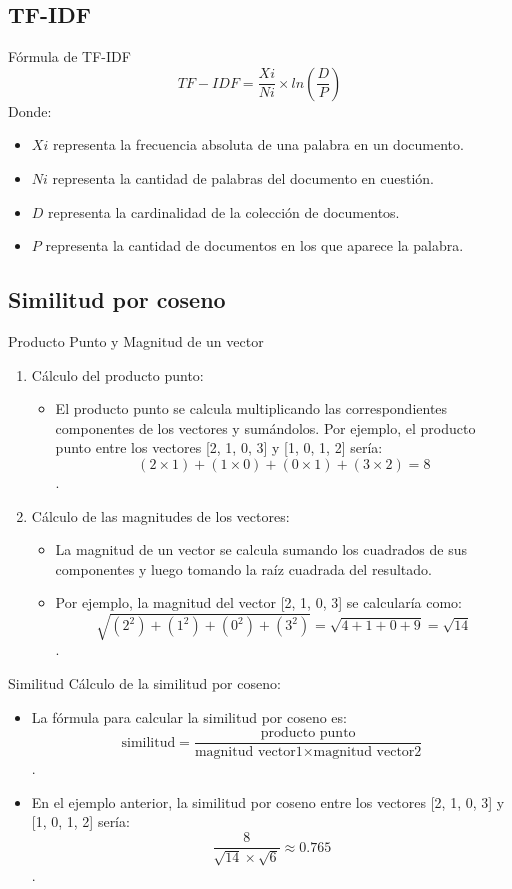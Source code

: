 \documentclass{beamer}
\begin{document}
\subsection{TF-IDF}
\begin{frame}{Fórmula de TF-IDF}
\[TF-IDF = \frac{Xi}{Ni} \times ln\left(\frac{D}{P}\right)\]
Donde:
\begin{itemize}
\item $Xi$
representa la frecuencia absoluta de una palabra en un documento.
\item $Ni$
representa la cantidad de palabras del documento en cuestión.
\item $D$
representa la cardinalidad de la colección de documentos.
\item $P$
representa la cantidad de documentos en los que aparece la palabra.
\end{itemize}

\end{frame}
\subsection{Similitud por coseno}
\begin{frame}{Producto Punto y Magnitud de un vector}
\begin{enumerate}
\item Cálculo del producto punto:
\begin{itemize}
 \item  El producto punto se calcula multiplicando las correspondientes componentes de los vectores y sumándolos. Por ejemplo, el producto punto entre los vectores [2, 1, 0, 3] y [1, 0, 1, 2] sería: \[(2\times 1) + (1\times 0) + (0\times 1) + (3\times 2) = 8\].
\end{itemize}
\item  Cálculo de las magnitudes de los vectores:
\begin{itemize}
  \item  La magnitud de un vector se calcula sumando los cuadrados de sus componentes y luego tomando la raíz cuadrada del resultado.
  \item  Por ejemplo, la magnitud del vector [2, 1, 0, 3] se calcularía como:\[\sqrt{(2^2) + (1^2) + (0^2) + (3^2)} = \sqrt{4 + 1 + 0 + 9} = \sqrt{14}\].
\end{itemize}
\end{enumerate}
\end{frame}

\begin{frame}{Similitud}
Cálculo de la similitud por coseno:
\begin{itemize}
   \item La fórmula para calcular la similitud por coseno es: \[\text{similitud} = \frac{{\text{producto punto}}}{{\text{magnitud vector1} \times \text{magnitud vector2}}}\].
  \item En el ejemplo anterior, la similitud por coseno entre los vectores [2, 1, 0, 3] y [1, 0, 1, 2] sería: \[\frac{8}{{\sqrt{14} \times \sqrt{6}}} \approx 0.765\].
\end{itemize}
\end{frame}
\end{document}
